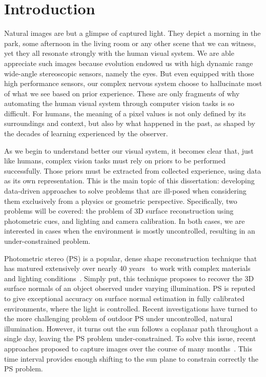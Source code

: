 \chapter*{Introduction}         %

Natural images are but a glimpse of captured light. They depict a morning in the park, some afternoon in the living room or any other scene that we can witness, yet they all resonate strongly with the human visual system. We are able appreciate such images because evolution endowed us with high dynamic range wide-angle stereoscopic sensors, namely the eyes. But even equipped with those high performance sensors, our complex nervous system choose to hallucinate most of what we see based on prior experience. These are only fragments of why automating the human visual system through computer vision tasks is so difficult. For humans, the meaning of a pixel values is not only defined by its surroundings and context, but also by what happened in the past, as shaped by the decades of learning experienced by the observer.

As we begin to understand better our visual system, it becomes clear that, just like humans, complex vision tasks must rely on priors to be performed successfully. Those priors must be extracted from collected experience, using data as its own representation. This is the main topic of this dissertation: developing data-driven approaches to solve problems that are ill-posed when considering them exclusively from a physics or geometric perspective. Specifically, two problems will be covered: the problem of 3D surface reconstruction using photometric cues, and lighting and camera calibration. In both cases, we are interested in cases when the environment is mostly uncontrolled, resulting in an under-constrained problem.


Photometric stereo (PS) is a popular, dense shape reconstruction technique that has matured extensively over nearly 40 years~\cite{woodham-opteng-80} to work with complex materials and lighting conditions~\cite{alldrin-cvpr-08,basri-ijcv-07,johnson-cvpr-11,oxholm-eccv-12}.
Simply put, this technique proposes to recover the 3D surface normals of an object observed under varying illumination.
PS is reputed to give exceptional accuracy on surface normal estimation in fully calibrated environments, where the light is controlled.
Recent investigations have turned to the more challenging problem of outdoor PS under uncontrolled, natural illumination. However, it turns out the sun follows a coplanar path throughout a single day, leaving the PS problem under-constrained. To solve this issue, recent approaches proposed to capture images over the course of many months~\cite{ackermann-cvpr-12,abrams-eccv-12}. This time interval provides enough shifting to the sun plane to constrain correctly the PS problem.

